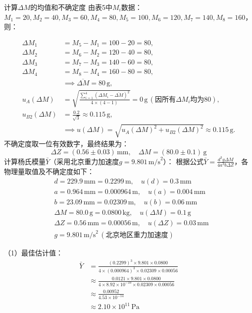 \documentclass[11pt]{article}
\begin{document}
\begin{enumerate}
    计算\(\Delta M\)的均值和不确定度
    由表5中\( M_i \)数据：\( M_1=20, M_2=40, M_3=60, M_4=80, M_5=100, M_6=120, M_7=140, M_8=160 \)，则：

    \begin{align*}
    \Delta M_1 &= M_5 - M_1 = 100 - 20 = 80, \\
    \Delta M_2 &= M_6 - M_2 = 120 - 40 = 80, \\
    \Delta M_3 &= M_7 - M_3 = 140 - 60 = 80, \\
    \Delta M_4 &= M_8 - M_4 = 160 - 80 = 80, \\
    &\implies \overline{\Delta M} = 80 \, \text{g}, \\
    u_A(\Delta M) &= \sqrt{\frac{\sum_{i=1}^4 (\Delta M_i - \overline{\Delta M})^2}{4 \times (4-1)}} = 0 \, \text{g} \, (\text{因所有}\Delta M_i\text{均为80}), \\
    u_{B2}(\Delta M) &= \frac{0.2}{\sqrt{3}} \approx 0.115 \, \text{g}, \\
    &\implies u(\Delta M) = \sqrt{u_A(\Delta M)^2 + u_{B2}(\Delta M)^2} \approx 0.115 \, \text{g}.
    \end{align*}
     不确定度取一位有效数字，最终结果为：
    \[
    \Delta Z = (0.56 \pm 0.03) \, \text{mm}, \quad \Delta M = (80.0 \pm 0.1) \, \text{g}
    \]
    计算杨氏模量\(\bar{Y}\)（采用北京重力加速度\(g = 9.801 \, \text{m/s}^2\)）：  
    根据公式\(\bar{Y} = \frac{d^3 g \Delta M}{4a^3 b \Delta Z}\)，各物理量取值及不确定度如下：  
    \begin{align*}
    &d = 229.9 \, \text{mm} = 0.2299 \, \text{m}, \quad u(d) = 0.3 \, \text{mm} \\
    &a = 0.964 \, \text{mm} = 0.000964 \, \text{m}, \quad u(a) = 0.004 \, \text{mm} \\
    &b = 23.09 \, \text{mm} = 0.02309 \, \text{m}, \quad u(b) = 0.06 \, \text{mm} \\
    &\Delta M = 80.0 \, \text{g} = 0.0800 \, \text{kg}, \quad u(\Delta M) = 0.1 \, \text{g} \\
    &\Delta Z = 0.56 \, \text{mm} = 0.00056 \, \text{m}, \quad u(\Delta Z) = 0.03 \, \text{mm} \\
    &g = 9.801 \, \text{m/s}^2 \, (\text{北京地区重力加速度})
    \end{align*}
    
    \noindent（1）最佳估计值：  
    \begin{align*}
    \bar{Y} &= \frac{(0.2299)^3 \times 9.801 \times 0.0800}{4 \times (0.000964)^3 \times 0.02309 \times 0.00056} \\
    &\approx \frac{0.0121 \times 9.801 \times 0.0800}{4 \times 8.92 \times 10^{-10} \times 0.02309 \times 0.00056} \\
    &\approx \frac{0.00952}{4.53 \times 10^{-14}} \\
    &\approx 2.10 \times 10^{11} \, \text{Pa}
    \end{align*}
    

\end{enumerate}
\end{document}
